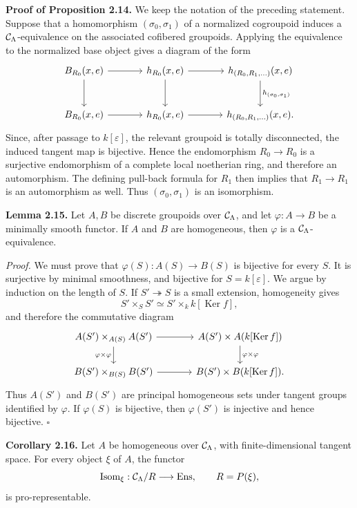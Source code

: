 \documentclass[11pt]{article}
\providecommand{\Isom}{\operatorname{Isom}}
\providecommand{\Ker}{\operatorname{Ker}}
\providecommand{\Isom}{\operatorname{Isom}}
\begin{document}
\textbf{Proof of Proposition 2.14.}  We keep the notation of the preceding statement.  Suppose that a homomorphism \((\sigma_0,\sigma_1)\) of a normalized cogroupoid induces a \(\mathcal C_\Lambda\)-equivalence on the associated cofibered groupoids.  Applying the equivalence to the normalized base object gives a diagram of the form
\[
\begin{tikzcd}[column sep=large,row sep=large]
 B_{R_0}(x,e) \arrow[r] \arrow[d] & h_{R_0}(x,e) \arrow[r] \arrow[d] & h_{(R_0,R_1,\ldots)}(x,e) \arrow[d,"h_{(\sigma_0,\sigma_1)}"] \\
 B_{R_0}(x,e) \arrow[r] & h_{R_0}(x,e) \arrow[r] & h_{(R_0,R_1,\ldots)}(x,e).
\end{tikzcd}
\]
Since, after passage to \(k[\varepsilon]\), the relevant groupoid is totally disconnected, the induced tangent map is bijective.  Hence the endomorphism \(R_0\to R_0\) is a surjective endomorphism of a complete local noetherian ring, and therefore an automorphism.  The defining pull-back formula for \(R_1\) then implies that \(R_1\to R_1\) is an automorphism as well.  Thus \((\sigma_0,\sigma_1)\) is an isomorphism.

\textbf{Lemma 2.15.}  Let \(A,B\) be discrete groupoids over \(\mathcal C_\Lambda\), and let \(\varphi:A\to B\) be a minimally smooth functor.  If \(A\) and \(B\) are homogeneous, then \(\varphi\) is a \(\mathcal C_\Lambda\)-equivalence.

\textit{Proof.}  We must prove that \(\varphi(S):A(S)\to B(S)\) is bijective for every \(S\).  It is surjective by minimal smoothness, and bijective for \(S=k[\varepsilon]\).  We argue by induction on the length of \(S\).  If \(S'\twoheadrightarrow S\) is a small extension, homogeneity gives
\[
 S'\times_S S' \simeq S'\times_k k[\Ker f],
\]
and therefore the commutative diagram
\[
\begin{tikzcd}[column sep=large]
 A(S')\times_{A(S)}A(S') \arrow[r] \arrow[d,"\varphi\times\varphi"'] & A(S')\times A(k[\Ker f]) \arrow[d,"\varphi\times\varphi"] \\
 B(S')\times_{B(S)}B(S') \arrow[r] & B(S')\times B(k[\Ker f]).
\end{tikzcd}
\]
Thus \(A(S')\) and \(B(S')\) are principal homogeneous sets under tangent groups identified by \(\varphi\).  If \(\varphi(S)\) is bijective, then \(\varphi(S')\) is injective and hence bijective. \(\square\)

\textbf{Corollary 2.16.}  Let \(A\) be homogeneous over \(\mathcal C_\Lambda\), with finite-dimensional tangent space.  For every object \(\xi\) of \(A\), the functor
\[
 \Isom_\xi:\cC_\Lambda/R\longrightarrow \mathrm{Ens},\qquad R=P(\xi),
\]
is pro-representable.
\end{document}
